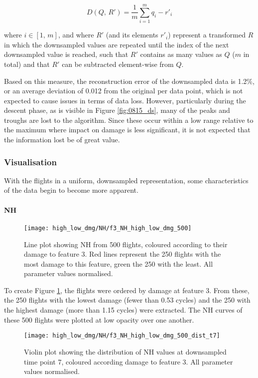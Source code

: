 \[
    D(Q,\,R') = \frac{1}{m}\sum_{i=1}^{m}{q_i - r'_i}
\]

where \(i \in \left[1,\,m\right]\), and where \(R'\) (and its elements \(r'_i\)) represent a transformed \(R\) in which the downsampled values are repeated until the index of the next downsampled value is reached, such that \(R'\) contains as many values as \(Q\) (\(m\) in total) and that \(R'\) can be subtracted element-wise from \(Q\).

Based on this measure, the reconstruction error of the downsampled data is 1.2\%, or an average deviation of 0.012 from the original per data point, which is not expected to cause issues in terms of data loss. However, particularly during the descent phase, as is visible in Figure \ref{fig:0815_ds}, many of the peaks and troughs are lost to the algorithm. Since these occur within a low range relative to the maximum where impact on damage is less significant, it is not expected that the information lost be of great value.

\subsubsection{Visualisation}
With the flights in a uniform, downsampled representation, some characteristics of the data begin to become more apparent.

\paragraph{NH}
\begin{figure}
    \centering
    \texttt{[image: high\_low\_dmg/NH/f3\_NH\_high\_low\_dmg\_500]}
    \caption{\label{fig:high_low_dmg_NH} Line plot showing NH from 500 flights, coloured according to their damage to feature 3. Red lines represent the 250 flights with the most damage to this feature, green the 250 with the least. All parameter values normalised.}
\end{figure}

To create Figure \ref{fig:high_low_dmg_NH}, the flights were ordered by damage at feature 3. From these, the 250 flights with the lowest damage (fewer than 0.53 cycles) and the 250 with the highest damage (more than 1.15 cycles) were extracted. The NH curves of these 500 flights were plotted at low opacity over one another.

\begin{figure}
    \centering
    \texttt{[image: high\_low\_dmg/NH/f3\_NH\_high\_low\_dmg\_500\_dist\_t7]}
    \caption{\label{fig:dmg_violin_NH} Violin plot showing the distribution of NH values at downsampled time point 7, coloured according damage to feature 3. All parameter values normalised.}
\end{figure}

